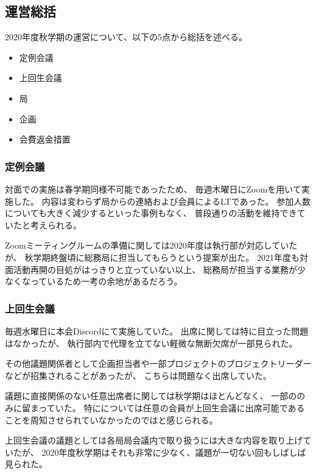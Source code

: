 \subsection*{運営総括}


2020年度秋学期の運営について、以下の5点から総括を述べる。
\begin{itemize}
  \item 定例会議
  \item 上回生会議
  \item 局
  \item 企画
  \item 会費返金措置
\end{itemize}

\subsubsection*{定例会議}
対面での実施は春学期同様不可能であったため、
毎週木曜日にZoomを用いて実施した。
内容は変わらず局からの連絡および会員によるLTであった。
参加人数についても大きく減少するといった事例もなく、
普段通りの活動を維持できていたと考えられる。

Zoomミーティングルームの準備に関しては2020年度は執行部が対応していたが、
秋学期終盤頃に総務局に担当してもらうという提案が出た。
2021年度も対面活動再開の目処がはっきりと立っていない以上、
総務局が担当する業務が少なくなっているため一考の余地があるだろう。

\subsubsection*{上回生会議}
毎週水曜日に本会Discordにて実施していた。
出席に関しては特に目立った問題はなかったが、
執行部内で代理を立てない軽微な無断欠席が一部見られた。

その他議題関係者として企画担当者や一部プロジェクトのプロジェクトリーダーなどが招集されることがあったが、
こちらは問題なく出席していた。

議題に直接関係のない任意出席者に関しては秋学期はほとんどなく、
一部の\fourthGrade{}のみに留まっていた。
特に\firstGrade{}については任意の会員が上回生会議に出席可能であることを周知させられていなかったのではと感じられる。

上回生会議の議題としては各局局会議内で取り扱うには大きな内容を取り上げていたが、
2020年度秋学期はそれも非常に少なく、議題が一切ない回もしばしば見られた。

